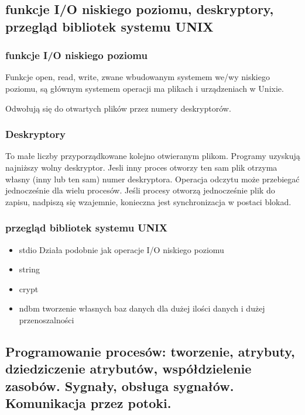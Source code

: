 \documentclass[a4paper,twoside]{report}
\begin{document}
\subsection{funkcje I/O niskiego poziomu, deskryptory, przegląd bibliotek systemu UNIX }

\subsubsection{funkcje I/O niskiego poziomu}

Funkcje open, read, write, zwane wbudowanym systemem we/wy niskiego poziomu, są głównym systemem operacji ma plikach i urządzeniach w Unixie.

Odwołują się do otwartych plików przez numery deskryptorów.

\subsubsection{Deskryptory}

To małe liczby przyporządkowane kolejno otwieranym plikom. Programy uzyskują najniższy wolny deskryptor. Jesli inny proces otworzy ten sam plik otrzyma własny (inny lub ten sam) numer deskryptora. Operacja odczytu może przebiegać jednocześnie dla wielu procesów. Jeśli procesy otworzą jednocześnie plik do zapisu, nadpiszą się wzajemnie, konieczna jest synchronizacja w postaci blokad. 

\subsubsection{przegląd bibliotek systemu UNIX}

\begin{itemize}
	\item stdio 
	Działa podobnie jak operacje I/O niskiego poziomu
	\item string 
	\item crypt 
	\item ndbm
	tworzenie własnych baz danych dla dużej ilości danych i dużej przenoszalności 
\end{itemize}

\subsection{ Programowanie procesów: tworzenie, atrybuty, dziedziczenie atrybutów, współdzielenie zasobów. Sygnały, obsługa sygnałów. Komunikacja przez potoki. }
\end{document}
